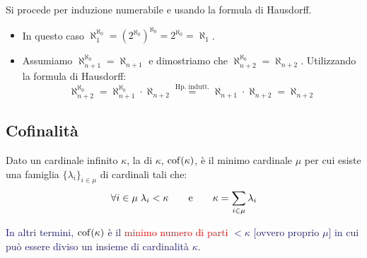 \begin{soln}
	Si procede per induzione numerabile e usando la formula di Hausdorff.
	\begin{itemize}
		\item[$\boxed{\text{caso 0}}$] In questo caso $\aleph_1^{\aleph_0} = (2^{\aleph_0})^{\aleph_0} = 2^{\aleph_0} = \aleph_1$.
		\item[$\boxed{\text{caso successore}}$] Assumiamo $\aleph_{n+1}^{\aleph_0} = \aleph_{n+1}$ e dimostriamo che $\aleph_{n+2}^{\aleph_0} = \aleph_{n+2}$. Utilizzando la formula di Hausdorff:
		\[ \aleph_{n+2}^{\aleph_0} = \aleph_{n+1}^{\aleph_0} \cdot \aleph_{n+2} \overset{\text{Hp. indutt.}}{=} \aleph_{n+1} \cdot \aleph_{n+2} = \aleph_{n+2}
			\]
	\end{itemize}
\end{soln}

\pagebreak
\subsection{Cofinalit\`a}

\begin{definition}[Cofinalit\`a - v.1]
	Dato un cardinale infinito $\kappa$, la  di $\kappa$, $\operatorname{cof}(\kappa)$, \`e il minimo cardinale 
	$\mu$ per cui esiste una famiglia $\{\lambda_i\}_{i \in \mu}$ di cardinali tali che:
	\[ \forall i \in \mu \; \lambda_i < \kappa \qquad \text e \qquad \kappa = \sum_{i \in \mu} \lambda_i
		\]
\end{definition}

\textcolor{MidnightBlue}{In altri termini, $\operatorname{cof}(\kappa)$ \`e il \textcolor{red}{minimo numero di parti} $<\kappa$ [ovvero proprio $\mu$] in cui pu\`o essere diviso un insieme di cardinalit\`a $\kappa$.}

